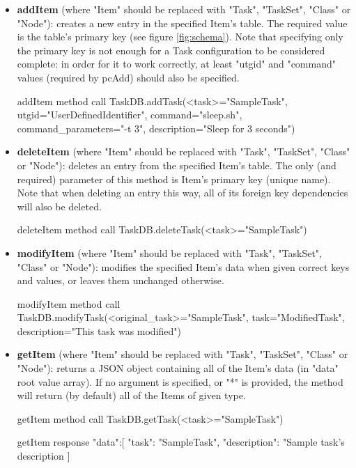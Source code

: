 \newpage
\begin{itemize}
    \item 
        \textbf{addItem} (where "Item" should be replaced with "Task", "TaskSet", "Class" or "Node"): creates a new entry in the specified Item's table. The required value is the table's primary key (see figure \ref{fig:schema}). Note that specifying only the primary key is not enough for a Task configuration to be considered complete: in order for it to work correctly, at least "utgid" and "command" values (required by pcAdd) should also be specified.

        \begin{sexylisting}[colback=white]{addItem method call}
TaskDB.addTask(<task>="SampleTask",
               utgid="UserDefinedIdentifier",
               command="sleep.sh",
               command_parameters="-t 3",
               description="Sleep for 3 seconds")
        \end{sexylisting}
    
    \item 
        \textbf{deleteItem} (where "Item" should be replaced with "Task", "TaskSet", "Class" or "Node"): deletes an entry from the specified Item's table. The only (and required) parameter of this method is Item's primary key (unique name). Note that when deleting an entry this way, all of its foreign key dependencies will also be deleted.
        
        \begin{sexylisting}[colback=white]{deleteItem method call}
TaskDB.deleteTask(<task>="SampleTask")
        \end{sexylisting}
    
    \item 
        \textbf{modifyItem} (where "Item" should be replaced with "Task", "TaskSet", "Class" or "Node"): modifies the specified Item's data when given correct keys and values, or leaves them unchanged otherwise.
        \begin{sexylisting}[colback=white]{modifyItem method call}
TaskDB.modifyTask(<original_task>="SampleTask",
                  task="ModifiedTask", 
                  description="This task was modified")
        \end{sexylisting}
    
    \item 
        \textbf{getItem} (where "Item" should be replaced with "Task", "TaskSet", "Class" or "Node"): returns a JSON object containing all of the Item's data (in "data" root value array). If no argument is specified, or "*" is provided, the method will return (by default) all of the Items of given type.
        \begin{sexylisting}[colback=white]{getItem method call}
TaskDB.getTask(<task>="SampleTask")
        \end{sexylisting}
        \begin{sexylisting}[colback=white]{getItem response}
{"data":[
    {
        "task": "SampleTask",
        "description": "Sample task's description
    }
]}
        \end{sexylisting}
    

\end{itemize}

